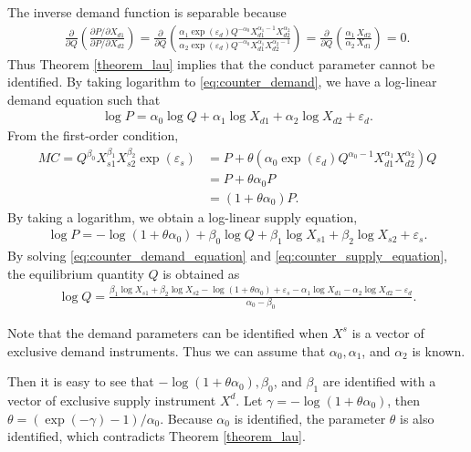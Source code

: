 \documentclass[11pt, a4paper]{article}
\theoremstyle{remark}
\begin{document}
The inverse demand function is separable because
\begin{align}
    \frac{\partial }{\partial Q} \left(\frac{\partial P/\partial X_{d1}}{\partial P/\partial X_{d2}} \right) = \frac{\partial }{\partial Q} \left(\frac{\alpha_{1}\exp(\varepsilon_{d}) Q^{-\alpha_0} X_{d1}^{\alpha_1-1}X_{d2}^{\alpha_2}}{\alpha_2\exp(\varepsilon_{d}) Q^{-\alpha_0} X_{d1}^{\alpha_1}X_{d2}^{\alpha_2-1}} \right) =  \frac{\partial }{\partial Q}\left(\frac{\alpha_1}{\alpha_2} \frac{X_{d2}}{X_{d1}} \right)=0.
\end{align}
Thus Theorem \ref{theorem_lau} implies that the conduct parameter cannot be identified.
By taking logarithm to \eqref{eq:counter_demand}, we have a log-linear demand equation such that 
\begin{align}
    \log P = \alpha_0 \log Q + \alpha_1 \log X_{d1}  + \alpha_2 \log X_{d2} + \varepsilon_{d}.\label{eq:counter_demand_equation}
\end{align}
From the first-order condition, 
\begin{align}
    MC = Q^{\beta_0} X_{s1}^{\beta_1}X_{s2}^{\beta_2}\exp(\varepsilon_{s}) & = P + \theta (\alpha_0 \exp(\varepsilon_{d})Q^{\alpha_0-1}X_{d1}^{\alpha_1}X_{d2}^{\alpha_2}) Q\\
    & = P + \theta \alpha_0 P\\
    &= (1 + \theta\alpha_0) P.
\end{align}
By taking a logarithm, we obtain a log-linear supply equation,
\begin{align}
    \log P = - \log(1 + \theta\alpha_0) + \beta_0 \log Q + \beta_1 \log X_{s1}+\beta_2 \log X_{s2} + \varepsilon_{s}.\label{eq:counter_supply_equation}
\end{align}
By solving \eqref{eq:counter_demand_equation} and \eqref{eq:counter_supply_equation}, the equilibrium quantity $Q$ is obtained as
\begin{align}
    \log Q = \frac{\beta_1 \log X_{s1}+\beta_2 \log X_{s2} - \log(1 + \theta\alpha_0)+ \varepsilon_{s} - \alpha_1 \log X_{d1}  - \alpha_2 \log X_{d2} - \varepsilon_{d} }{\alpha_0 - \beta_0}.
\end{align}

Note that the demand parameters can be identified when $X^s$ is a vector of exclusive demand instruments.
Thus we can assume that $\alpha_0, \alpha_1$, and $\alpha_2$ is known.  

Then it is easy to see that $- \log(1 + \theta\alpha_0), \beta_0$, and $\beta_1$ are identified with a vector of exclusive supply instrument $X^d$.
Let $\gamma = - \log(1 + \theta\alpha_0)$, then $\theta = (\exp(-\gamma) - 1)/\alpha_0$.
Because $\alpha_0$ is identified, the parameter $\theta$ is also identified, which contradicts Theorem \ref{theorem_lau}.
\end{document}
